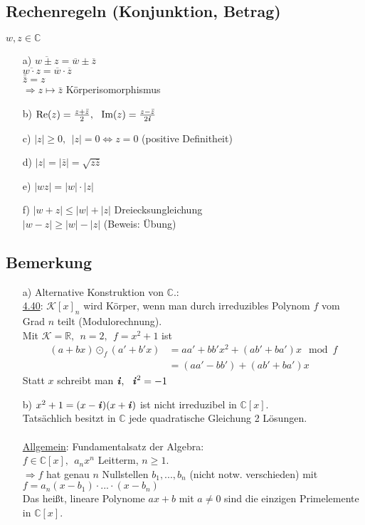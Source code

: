 \documentclass[12pt,titlepage, pdf]{article}
\newcommand{\R}{\mathds{R}}
\newcommand{\K}{\mathcal{K}}
\newcommand{\C}{\mathds{C}}
\newcommand{\uline}[1]{\underline{#1}}
\renewcommand{\Re}[1]{\text{Re}(#1)}
\renewcommand{\Im}[1]{\text{Im}(#1)}
\renewcommand{\i}{\textbf{\textit{i}}}
\renewcommand{\>}{\rightarrow}
\renewcommand{\*}{\cdot}
\begin{document}
\subsection{Rechenregeln (Konjunktion, Betrag)}
$w,z \in \C$
\begin{itemize}
	\item[a)] $\overline{w \pm z} = \overline{w} \pm \overline{z}$\\
	$\overline{w \cdot z} = \overline{w} \cdot \overline{z}$\\
	$\bar{\bar{z}} = z$\\
	$\Rightarrow z \mapsto \bar{z}$ Körperisomorphismus
	\item[b)] $\Re{z} =  \frac{z + \bar{z}}{2},~~ \Im{z} = \frac{z - \bar{z}}{2\i}$
	\item[c)] $|z| \geq 0,~~ |z| = 0 \Leftrightarrow z = 0$ (positive Definitheit)
	\item[d)] $|z| = |\bar{z}| = \sqrt{z\bar{z}}$
	\item[e)] $|wz| = |w| \cdot |z|$
	\item[f)] $|w+z| \leq |w| + |z|$ Dreiecksungleichung \\
	$|w-z| \geq |w| - |z|$ (Beweis: Übung)
\end{itemize}
\subsection{Bemerkung}
\begin{itemize}
	\item[a)] Alternative Konstruktion von $\C$.:\\
	\hyperref[4.40]{4.40}: $\K[x]_n$ wird Körper, wenn man durch irreduzibles Polynom $f$ vom Grad $n$ teilt (Modulorechnung).\\
	Mit $\K = \R, ~~n = 2,~~ f = x^2 +1$ ist 
	\begin{align*}
	(a+bx) \odot_f (a' + b'x) &= aa' + bb'x^2 + (ab' + ba')x \mod f\\
	&= (aa' - bb') + (ab' + ba')x
	\end{align*}
	Statt $x$ schreibt man $\i,~~\i^2 = -1$
	\item[b)]
	$x^2 +1 = (x-\i)(x+\i)$ ist nicht irreduzibel in $\C[x]$.\\
	Tatsächlich besitzt in $\C$ jede quadratische Gleichung 2 Lösungen.\\
	\\ \uline{Allgemein}: Fundamentalsatz der Algebra: \\
	$f \in \C[x],~~ a_nx^n$ Leitterm, $n \geq 1$. \\
	$\Rightarrow f$ hat genau $n$ Nullstellen $b_1,...,b_n$ (nicht notw. verschieden) mit\\ $f = a_n(x-b_1) \cdot ... \cdot (x-b_n)$ \\
	Das heißt, lineare Polynome $ax +b$ mit $a \neq 0$ sind die einzigen Primelemente in $\C[x]$.
\end{itemize}
\end{document}
